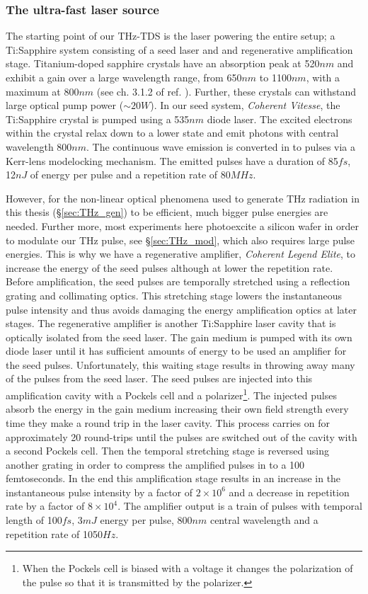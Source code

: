 \subsubsection{The ultra-fast laser source}
The starting point of our THz-TDS is the laser powering the entire setup; a Ti:Sapphire system consisting of a seed laser and and regenerative amplification stage. Titanium-doped sapphire crystals have an absorption peak at 520$nm$ and exhibit a gain over a large wavelength range, from 650$nm$ to 1100$nm$, with a maximum at 800$nm$ (see ch. 3.1.2 of ref. \cite{PrinciplesofTHz}). Further, these crystals can withstand large optical pump power ($\sim 20W$). In our seed system, \textit{Coherent Vitesse},  the Ti:Sapphire crystal is pumped using a 535$nm$ diode laser. The excited electrons within the crystal relax down to a lower state and emit photons with central wavelength 800$nm$. The continuous wave emission is converted in to pulses via a Kerr-lens modelocking mechanism. The emitted pulses have a duration of 85$fs$, 12$nJ$ of energy per pulse and a repetition rate of 80$MHz$. 

However, for the non-linear optical phenomena used to generate THz radiation in this thesis (\S \ref{sec:THz_gen}) to be efficient, much bigger pulse energies are needed.  Further more, most experiments here photoexcite a silicon wafer in order to modulate our THz pulse, see \S\ref{sec:THz_mod}, which also requires large pulse energies. This is why we have a regenerative amplifier, \textit{Coherent Legend Elite}, to increase the energy of the seed pulses although at lower the repetition rate. Before amplification, the seed pulses are temporally stretched using a reflection grating and collimating optics. This stretching stage lowers the instantaneous pulse intensity and thus avoids damaging the energy amplification optics at later stages. The regenerative amplifier is another Ti:Sapphire laser cavity that is optically isolated from the seed laser. The gain medium is pumped with its own diode laser until it has sufficient amounts of energy to be used an amplifier for the seed pulses. Unfortunately, this waiting stage results in throwing away many of the pulses from the seed laser. The seed pulses are injected into this amplification cavity with a Pockels cell and a polarizer\footnote{When the Pockels cell is biased with a voltage it changes the polarization of the pulse so that it is transmitted by the polarizer.}. The injected pulses absorb the energy in the gain medium increasing their own field strength every time they make a round trip in the laser cavity. This process carries on for approximately 20 round-trips until the pulses are switched out of the cavity with a second Pockels cell. Then the temporal stretching stage is reversed using another grating in order to compress the amplified pulses in to a 100 femtoseconds. In the end this amplification stage results in an increase in the instantaneous pulse intensity by a factor of $2 \times 10^6$ and a decrease in repetition rate by a factor of $8\times 10^4$. The amplifier output is a train of pulses with temporal length of 100$fs$, 3$mJ$ energy per pulse, 800$nm$ central wavelength and a repetition rate of 1050$Hz$. 


